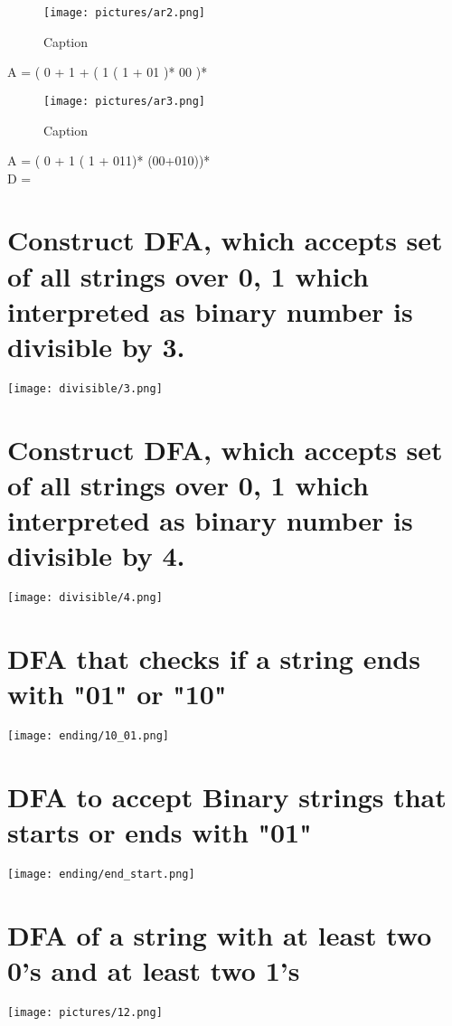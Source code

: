 \documentclass[8pt]{article}
\begin{document}
\begin{figure}[H]
    \centering
    \texttt{[image: pictures/ar2.png]}
    \caption{Caption}
    \label{fig:placeholder}
\end{figure}
A = ( 0 + 1 + ( 1 ( 1 + 01 )* 00 )*
\begin{figure}[H]
    \centering
    \texttt{[image: pictures/ar3.png]}
    \caption{Caption}
    \label{fig:placeholder}
\end{figure}
A = ( 0 + 1 ( 1 + 011)* (00+010))*\\
D = 
\section{Construct DFA, which accepts set of all strings over {0, 1} which interpreted as binary number is divisible by 3. }
\begin{center}
    \texttt{[image: divisible/3.png]} 
\end{center}
\section{Construct DFA, which accepts set of all strings over {0, 1} which interpreted as binary number is divisible by 4. }
\begin{center}
    \texttt{[image: divisible/4.png]} %
\end{center}
\section{ DFA that checks if a string ends with "01" or "10"}
\begin{center}
    \texttt{[image: ending/10\_01.png]} %
\end{center}
\section{DFA to accept Binary strings that starts or ends with "01"}
\begin{center}
    \texttt{[image: ending/end\_start.png]} %
\end{center}
\section{DFA of a string with at least two 0’s and at least two 1’s}
\begin{center}
    \texttt{[image: pictures/12.png]} %
\end{center}
\end{document}

